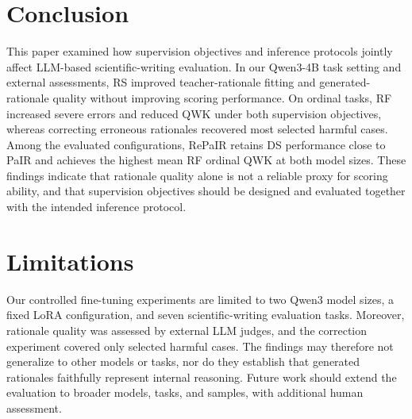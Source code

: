 \section{Conclusion}


This paper examined how supervision objectives and inference protocols
jointly affect LLM-based scientific-writing evaluation. In our Qwen3-4B task
setting and external assessments, RS improved teacher-rationale fitting and
generated-rationale quality without improving scoring performance. On ordinal
tasks, RF increased severe errors and reduced QWK under both supervision
objectives, whereas correcting erroneous rationales recovered most selected
harmful cases. Among the evaluated configurations, RePaIR retains DS performance
close to PaIR and achieves the highest mean RF ordinal QWK at both model sizes.
These findings indicate that rationale quality alone is not a reliable proxy
for scoring ability, and that supervision objectives should be designed and
evaluated together with the intended inference protocol.

\section{Limitations}


Our controlled fine-tuning experiments are limited to two Qwen3 model
sizes, a fixed LoRA configuration, and seven scientific-writing evaluation
tasks. Moreover,
rationale quality was assessed
by external LLM judges, and the correction experiment covered only selected
harmful cases. The findings may therefore not generalize to other models or
tasks, nor do they establish that generated rationales faithfully represent
internal reasoning. Future work should extend the evaluation to broader models,
tasks, and samples, with additional human assessment.

